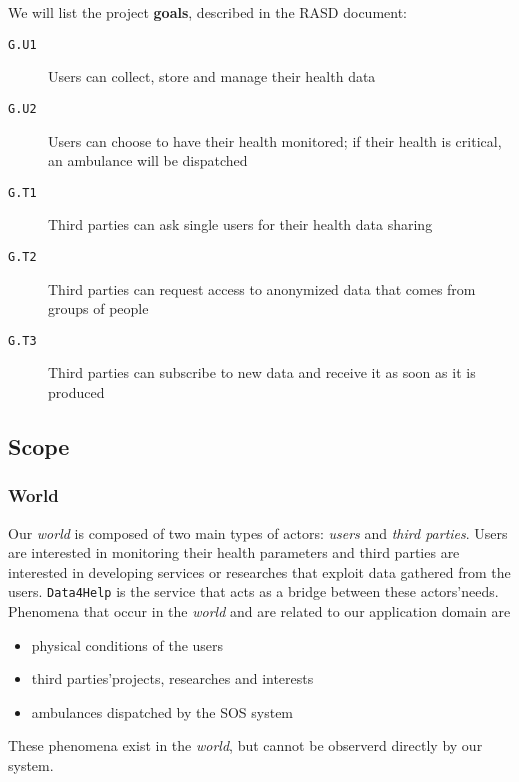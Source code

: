 \documentclass[../DD0.tex]{subfiles}
\begin{document}
    We will list the project \textbf{goals}, described in the RASD document:
    \begin{description}
      \item[\texttt{G.U1}] Users can collect, store and manage their health data

      \item[\texttt{G.U2}] Users can choose to have their health monitored; if their health is critical, an ambulance will be dispatched

      \item[\texttt{G.T1}] Third parties can ask single users for their health data sharing

      \item[\texttt{G.T2}] Third parties can request access to anonymized data that comes from groups of people

      \item[\texttt{G.T3}] Third parties can subscribe to new data and receive it as soon as it is produced
    \end{description}

  \subsection{Scope}
  \label{sec:scope}

    \subsubsection{World}

      Our \textit{world} is composed of two main types of actors: \textit{users} and \textit{third parties}. Users are interested in monitoring their health parameters and third parties are interested in developing services or researches that exploit data gathered from the users. \texttt{Data4Help} is the service that acts as a bridge between these actors'needs. \\
      Phenomena that occur in the \textit{world} and are related to our application domain are
      \begin{itemize}
        \item physical conditions of the users

        \item third parties'projects, researches and interests

        \item ambulances dispatched by the SOS system
      \end{itemize}
      These phenomena exist in the \textit{world}, but cannot be observerd directly by our system.
\end{document}
